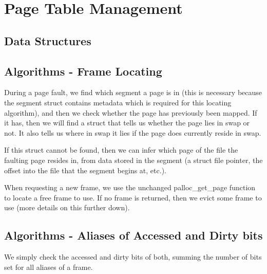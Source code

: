 \section{Page Table Management}

\subsection{Data Structures}


\subsection{Algorithms - Frame Locating}


During a page fault, we find which segment a page is in (this is necessary
because the segment struct contains metadata which is required for this locating
algorithm), and then we check whether the page has previously been mapped. If it
has, then we will find a struct that tells us whether the page lies in swap or
not. It also tells us where in swap it lies if the page does currently reside in
swap.

If this struct cannot be found, then we can infer which page of the file the
faulting page resides in, from data stored in the segment (a struct file
pointer, the offset into the file that the segment begins at, etc.).

When requesting a new frame, we use the unchanged palloc\_get\_page function to
locate a free frame to use. If no frame is returned, then we evict some frame to
use (more details on this further down).

\subsection{Algorithms - Aliases of Accessed and Dirty bits}


We simply check the accessed and dirty bits of both, summing the number of bits
set for all aliases of a frame.

